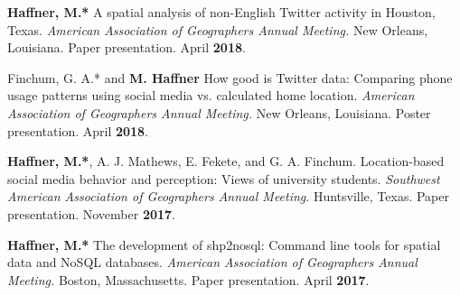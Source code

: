 \begin{cventries}
   \cventry
      {}
      {}
      {}
      {}
      {
        \begin{cvitems}
          \vspace{-2mm}
        \item {\textbf{Haffner, M.*} A spatial analysis of non-English Twitter
            activity in Houston, Texas.
             \textit{American Association of Geographers Annual Meeting.} New Orleans, Louisiana.
            Paper presentation. April \textbf{2018}.}
          \end{cvitems}
        } %

   \cventry
      {}
      {}
      {}
      {}
      {
        \begin{cvitems}
          \vspace{-2mm}
        \item {Finchum, G. A.* and \textbf{M. Haffner} How good is Twitter data:
            Comparing phone usage patterns using social media vs. calculated
            home location.
             \textit{American Association of Geographers Annual Meeting.} New Orleans, Louisiana.
            Poster presentation. April \textbf{2018}.}
          \end{cvitems}
        } %

   \cventry
      {}
      {}
      {}
      {}
      {
        \begin{cvitems}
          \vspace{-2mm}
        \item {\textbf{Haffner, M.*}, A. J. Mathews, E. Fekete, and G. A.
            Finchum. Location-based social media behavior and perception: Views
            of university students. \textit{Southwest American Association of
              Geographers Annual Meeting}. Huntsville, Texas. Paper
            presentation. November \textbf{2017}.}
          \end{cvitems}
        } %

   \cventry
      {}
      {}
      {}
      {}
      {
        \begin{cvitems}
          \vspace{-2mm}
        \item {\textbf{Haffner, M.*} The development of shp2nosql: Command line
            tools for spatial data and NoSQL databases. \textit{American
            Association of Geographers Annual Meeting.} Boston, Massachusetts.
            Paper presentation. April \textbf{2017}.}
          \end{cvitems}
        } %


\end{cventries}
